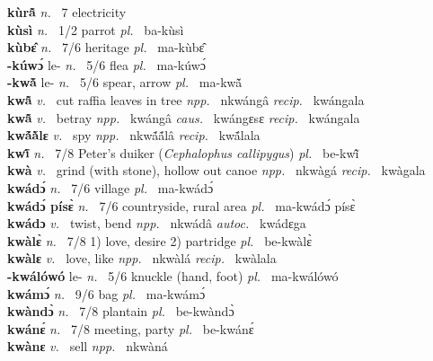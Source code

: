 {\bfseries kùrã̂}  {\itshape n.~} 7 electricity    \\ 
{\bfseries kùsì}  {\itshape n.~} 1/2 parrot {\itshape pl.~} ba-kùsì    \\ 
{\bfseries kùbɛ̂}  {\itshape n.~} 7/6 heritage {\itshape pl.~} ma-kùbɛ̂    \\ 
{\bfseries -kúwɔ́} le- {\itshape n.~} 5/6 flea {\itshape pl.~} ma-kúwɔ́    \\ 
{\bfseries -kwã̌} le- {\itshape n.~} 5/6 spear, arrow {\itshape pl.~} ma-kwã̌    \\ 
{\bfseries kwã̂}  {\itshape v.~} cut raffia leaves in tree   {\itshape npp.~} nkwángâ {\itshape recip.~} kwángala \\ 
{\bfseries kwã̂}  {\itshape v.~} betray   {\itshape npp.~} kwángâ {\itshape caus.~} kwángɛsɛ {\itshape recip.~} kwángala \\ 
{\bfseries kwã́ã̀lɛ}  {\itshape v.~} spy   {\itshape npp.~} nkwã́ã́lâ {\itshape recip.~} kwã́lala  \\ 
{\bfseries kwĩ̂}  {\itshape n.~} 7/8 Peter's duiker ({\itshape Cephalophus callipygus}) {\itshape pl.~} be-kwĩ̂    \\ 
{\bfseries kwà}  {\itshape v.~} grind (with stone), hollow out canoe   {\itshape npp.~} nkwàgá {\itshape recip.~} kwàgala  \\ 
{\bfseries kwádɔ́}  {\itshape n.~} 7/6 village {\itshape pl.~} ma-kwádɔ́    \\ 
{\bfseries kwádɔ́ písɛ̀}  {\itshape n.~} 7/6 countryside, rural area {\itshape pl.~} ma-kwádɔ́ písɛ̀    \\ 
{\bfseries kwádɔ}  {\itshape v.~} twist, bend   {\itshape npp.~} nkwádâ {\itshape autoc.~} kwádɛga  \\ 
{\bfseries kwàlɛ̀}  {\itshape n.~} 7/8 1) love, desire 2) partridge {\itshape pl.~} be-kwàlɛ̀    \\ 
{\bfseries kwàlɛ}  {\itshape v.~} love, like   {\itshape npp.~} nkwàlá {\itshape recip.~} kwàlala  \\ 
{\bfseries -kwálówó} le- {\itshape n.~} 5/6 knuckle (hand, foot) {\itshape pl.~} ma-kwálówó    \\ 
{\bfseries kwámɔ́}  {\itshape n.~} 9/6 bag {\itshape pl.~} ma-kwámɔ́   \\ 
{\bfseries kwàndɔ̀}  {\itshape n.~} 7/8 plantain {\itshape pl.~} be-kwàndɔ̀    \\ 
{\bfseries kwánɛ́}  {\itshape n.~} 7/8 meeting, party {\itshape pl.~} be-kwánɛ́    \\ 
{\bfseries kwànɛ}  {\itshape v.~} sell   {\itshape npp.~} nkwàná  \\ 
